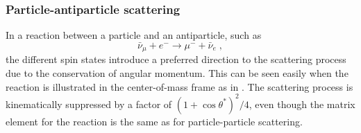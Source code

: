 \subsubsection{Particle-antiparticle scattering}
\label{sec:antineutrino-scattering}
In a reaction between a particle and an antiparticle, such as
\begin{equation}
    \bar{\nu}_\mu + e^- \rightarrow \mu^-  + \bar{\nu}_e\;,
\end{equation}
the different spin states introduce a preferred direction to the scattering process due to the conservation of angular momentum.
This can be seen easily when the reaction is illustrated in the center-of-mass frame as in .
The scattering process is kinematically suppressed by a factor of $(1 + \cos \theta^*)^2/4$, even though the matrix element for the reaction is the same as for particle-particle scattering.
